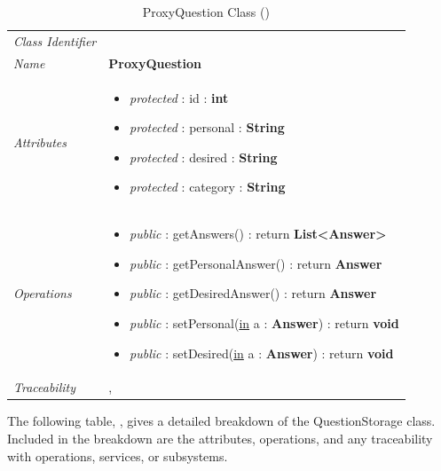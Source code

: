 \documentclass[12pt,letterpaper]{article}
\begin{document}
\begin{table}[H]
    \caption{ProxyQuestion Class ()} 
	\begin{tabu} to 
		\toprule
		Class Identifier &  \\
		Name & {\bf ProxyQuestion} \\
		Attributes & 
		\begin{minipage}[t]{\linewidth}
		    \begin{itemize}
		        \item \textit{protected} : id : {\bf int}
		        \item \textit{protected} : personal : {\bf String}
		        \item \textit{protected} : desired : {\bf String}
		        \item \textit{protected} : category : {\bf String}
			\end{itemize}
	    \end{minipage} \\

		Operations &
		\begin{minipage}[t]{\linewidth}
			\begin{itemize}
			    \item {\it public} : getAnswers() : return {\bf List<Answer>}
			    \item {\it public} : getPersonalAnswer() : return {\bf Answer}
			    \item {\it public} : getDesiredAnswer() : return {\bf Answer}
			    \item {\it public} : setPersonal(\underline{in} a : {\bf Answer}) : return {\bf void}
			    \item {\it public} : setDesired(\underline{in} a : {\bf Answer}) : return {\bf void}
	        \end{itemize}
	    \end{minipage} \\
	    	Traceability & , \\
		\toprule
	\end{tabu}
\end{table}

\newpage{}
The following table, , gives a detailed breakdown of the QuestionStorage class. Included in the breakdown are the attributes, operations, and any traceability with operations, services, or subsystems.
\end{document}
